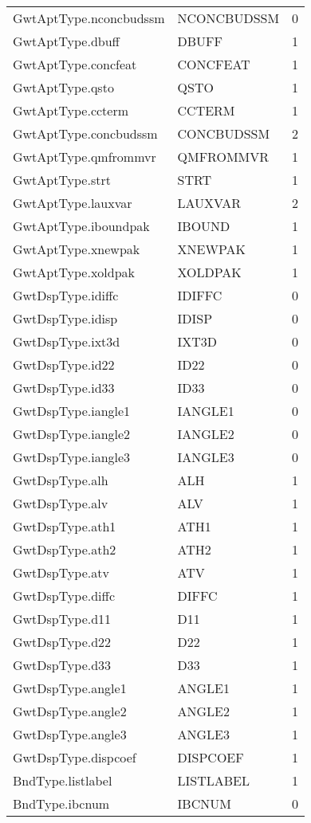\begin{longtable}{p{6cm} p{4cm} p{2cm} }
GwtAptType.nconcbudssm &  NCONCBUDSSM & 0 \\ 
GwtAptType.dbuff &  DBUFF & 1 \\ 
GwtAptType.concfeat &  CONCFEAT & 1 \\ 
GwtAptType.qsto &  QSTO & 1 \\ 
GwtAptType.ccterm &  CCTERM & 1 \\ 
GwtAptType.concbudssm & CONCBUDSSM & 2 \\ 
GwtAptType.qmfrommvr &  QMFROMMVR & 1 \\ 
GwtAptType.strt &  STRT & 1 \\ 
GwtAptType.lauxvar &  LAUXVAR & 2 \\ 
GwtAptType.iboundpak &  IBOUND & 1 \\ 
GwtAptType.xnewpak &  XNEWPAK & 1 \\ 
GwtAptType.xoldpak &  XOLDPAK & 1 \\ 
GwtDspType.idiffc &  IDIFFC & 0 \\ 
GwtDspType.idisp &  IDISP & 0 \\ 
GwtDspType.ixt3d &  IXT3D & 0 \\ 
GwtDspType.id22 &  ID22 & 0 \\ 
GwtDspType.id33 &  ID33 & 0 \\ 
GwtDspType.iangle1 &  IANGLE1 & 0 \\ 
GwtDspType.iangle2 &  IANGLE2 & 0 \\ 
GwtDspType.iangle3 &  IANGLE3 & 0 \\ 
GwtDspType.alh &  ALH & 1 \\ 
GwtDspType.alv &  ALV & 1 \\ 
GwtDspType.ath1 &  ATH1 & 1 \\ 
GwtDspType.ath2 &  ATH2 & 1 \\ 
GwtDspType.atv &  ATV & 1 \\ 
GwtDspType.diffc &  DIFFC & 1 \\ 
GwtDspType.d11 &  D11 & 1 \\ 
GwtDspType.d22 &  D22 & 1 \\ 
GwtDspType.d33 &  D33 & 1 \\ 
GwtDspType.angle1 &  ANGLE1 & 1 \\ 
GwtDspType.angle2 &  ANGLE2 & 1 \\ 
GwtDspType.angle3 &  ANGLE3 & 1 \\ 
GwtDspType.dispcoef &  DISPCOEF & 1 \\ 
BndType.listlabel &  LISTLABEL & 1 \\ 
BndType.ibcnum &  IBCNUM & 0 \\ 

\end{longtable}
